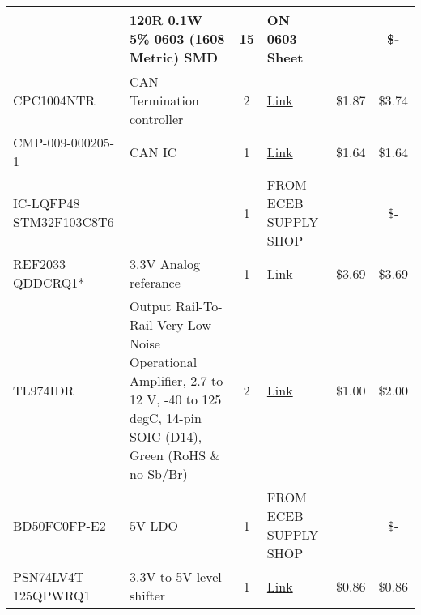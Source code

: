 \begin{xltabular}{\textwidth} {|X|X|c|X|c|c|}
    \hline
    & 120R 0.1W 5\% 0603 (1608 Metric)  SMD & 15 & ON 0603 Sheet & & \$- \\

    \hline
    CPC1004NTR & CAN Termination controller & 2 & \href{https://www.digikey.com/en/products/detail/ixys-integrated-circuits-division/CPC1004NTR/655298}{Link} & \$1.87 & \$3.74 \\

    \hline
    CMP-009-000205-1 & CAN IC & 1 & \href{https://www.digikey.com/en/products/detail/TCAN1044AEVDRQ1/296-TCAN1044AEVDRQ1CT-ND/18787167?curr=usd\&utm_campaign=buynow\&utm_medium=aggregator\&utm_source=octopart}{Link} & \$1.64 & \$1.64 \\

    \hline
    IC-LQFP48 STM32F103C8T6 & & 1 & FROM ECEB SUPPLY SHOP & & \$- \\

    \hline
    REF2033 QDDCRQ1* & 3.3V Analog referance & 1 & \href{https://www.digikey.com/en/products/detail/texas-instruments/REF2033QDDCRQ1/15926650}{Link} & \$3.69 & \$3.69 \\

    \hline
    TL974IDR & Output Rail-To-Rail Very-Low-Noise Operational Amplifier, 2.7 to 12 V, -40 to 125 degC, 14-pin SOIC (D14), Green (RoHS \& no Sb/Br) & 2 & \href{https://www.digikey.com/en/products/detail/texas-instruments/TL974IDR/1560257}{Link} & \$1.00 & \$2.00 \\

    \hline
    BD50FC0FP-E2 & 5V LDO & 1 & FROM ECEB SUPPLY SHOP & & \$- \\

    \hline
    PSN74LV4T 125QPWRQ1 & 3.3V to 5V level shifter & 1 & \href{https://www.mouser.com/ProductDetail/Texas-Instruments/SN74LV4T125PWR?qs=\%2Fd\%252BFzHvH4c3\%252BiZGZ\%252Bu8B9g\%3D\%3D\&utm_source=octopart\&utm_medium=aggregator\&utm_campaign=595-SN74LV4T125PWR\&utm_content=Texas\%20Instruments}{Link} & \$0.86 & \$0.86 \\

    \hline
\end{xltabular}


